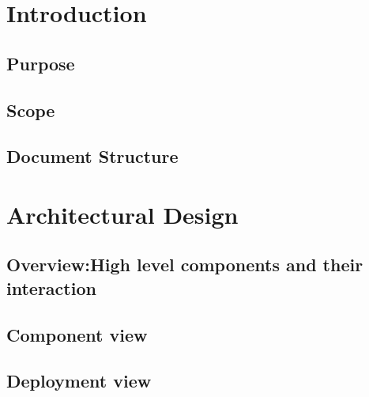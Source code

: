 \documentclass[openright]{report}
\newcommand\blankpage{%
    \null
    \thispagestyle{empty}%
    \addtocounter{page}{-1}%
    \newpage}
\begin{document}
	\begin{titlepage}
		
	\end{titlepage}


    \tableofcontents

    \newpage
    \blankpage
    \begin{abstract}
	\end{abstract}


	\part{Introduction}
    \chapter{Purpose}
    	
    \chapter{Scope}
    	
    \chapter{Document Structure}
    	
      
	\part{Architectural Design}
    \chapter{Overview:High level components and their interaction}
	    
	\chapter{Component view}
	    
	\chapter{Deployment view}
	    
\end{document}
